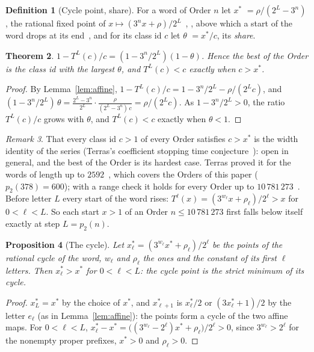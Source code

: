 \documentclass[10pt,a4paper,titlepage]{article}
\makeatletter
\newcommand{\termhere}[1]{\leavevmode
  \Hy@raisedlink{\hyper@anchorstart{term:#1}\hyper@anchorend}}
\newcommand{\keysym}[2]{\hyperlink{box:#1}{#2}}
\theoremstyle{plain}
\newtheorem{theorem}{Theorem}[section]
\newtheorem{proposition}[theorem]{Proposition}
\theoremstyle{definition}
\newtheorem{definition}[theorem]{Definition}
\theoremstyle{remark}
\newtheorem{remark}[theorem]{Remark}
\makeatother
\begin{document}
\begin{definition}[Cycle point, share]
\label{def:cycle}
\termhere{cyclepoint}\termhere{share}For a word of Order $n$ let \keysym{cyclepoint}{$x^\ast$} $= \rho/(2^L - 3^n)$, the rational fixed point of
$x \mapsto (3^n x + \rho)/2^L$~\cite[Prop.~5]{BohmSontacchi1978}, \cite[Thm.~2.1]{Lagarias1990}, above which a start of the word drops at its end~\cite[Prop.~1.7]{Terras1976}, and for its class id $c$ let \keysym{share}{$\theta$} $= x^\ast/c$, its \emph{share}.
\end{definition}

\begin{theorem}
\label{thm:cycle}
$1 - T^L(c)/c = (1 - 3^n/2^L)(1 - \theta)$. Hence the best of the Order is the class id with
the largest $\theta$, and $T^L(c) < c$ exactly when $c > x^\ast$.
\end{theorem}
\begin{proof}
By Lemma~\ref{lem:affine}, $1 - T^L(c)/c = 1 - 3^n/2^L - \rho/(2^L c)$, and
$(1 - 3^n/2^L)\,\theta = \frac{2^L - 3^n}{2^L}\cdot\frac{\rho}{(2^L - 3^n)\,c} = \rho/(2^L c)$. As
$1 - 3^n/2^L > 0$, the ratio $T^L(c)/c$ grows with $\theta$, and $T^L(c) < c$ exactly when $\theta < 1$.
\end{proof}

\begin{remark}
\label{rem:width}
That every class id $c > 1$ of every Order satisfies $c > x^\ast$ is the width identity of the series
(Terras's coefficient stopping time conjecture~\cite[Conj.~2.9]{Terras1976}):
open in general, and the best of the Order is its hardest case. Terras proved it for the words of
length up to $2592$~\cite[p.~252]{Terras1976}, which covers the Orders of this paper
($p_2(378) = 600$); with a range check it holds for every Order up to
$10\,781\,273$~\cite{Paper2}. Before letter $L$ every start of the word
rises: $T^\ell(x) = (3^{w_\ell}x + \rho_\ell)/2^\ell > x$ for $0 < \ell < L$. So each start $x > 1$ of an
Order $n \le 10\,781\,273$ first falls below itself exactly at step $L = p_2(n)$.
\end{remark}

\begin{proposition}[The cycle]
\label{prop:cyclemin}
Let $x^\ast_\ell = (3^{w_\ell} x^\ast + \rho_\ell)/2^\ell$ be the points of the rational cycle of the
word, $w_\ell$ and $\rho_\ell$ the ones and the constant of its first $\ell$ letters. Then
$x^\ast_\ell > x^\ast$ for $0 < \ell < L$: the cycle point is the strict minimum of its cycle.
\end{proposition}
\begin{proof}
$x^\ast_L = x^\ast$ by the choice of $x^\ast$, and $x^\ast_{\ell+1}$ is $x^\ast_\ell/2$ or
$(3x^\ast_\ell + 1)/2$ by the letter $e_\ell$ (as in Lemma~\ref{lem:affine}): the points form a cycle of
the two affine maps. For $0 < \ell < L$,
$x^\ast_\ell - x^\ast = \bigl((3^{w_\ell} - 2^\ell)x^\ast + \rho_\ell\bigr)/2^\ell > 0$, since
$3^{w_\ell} > 2^\ell$ for the nonempty proper prefixes, $x^\ast > 0$ and $\rho_\ell > 0$.
\end{proof}
\end{document}
